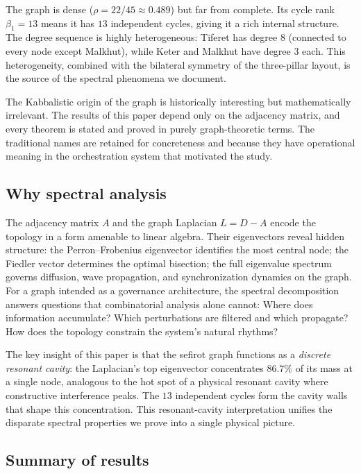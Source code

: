 \documentclass[11pt,a4paper]{amsart}
\theoremstyle{remark}
\begin{document}
The graph is dense ($\rho = 22/45 \approx 0.489$) but far from complete. Its
cycle rank $\beta_1 = 13$ means it has $13$ independent cycles, giving it a
rich internal structure. The degree sequence is highly heterogeneous:
Tiferet has degree $8$ (connected to every node except Malkhut), while Keter
and Malkhut have degree $3$ each. This heterogeneity, combined with the
bilateral symmetry of the three-pillar layout, is the source of the
spectral phenomena we document.

The Kabbalistic origin of the graph is historically interesting but
mathematically irrelevant. The results of this paper depend only on the
adjacency matrix, and every theorem is stated and proved in purely
graph-theoretic terms. The traditional names are retained for concreteness
and because they have operational meaning in the orchestration system that
motivated the study.

\subsection{Why spectral analysis}
\label{sec:why-spectral}

The adjacency matrix $A$ and the graph Laplacian $L = D - A$ encode the
topology in a form amenable to linear algebra. Their eigenvectors reveal
hidden structure: the Perron--Frobenius eigenvector identifies the most
central node; the Fiedler vector determines the optimal bisection; the full
eigenvalue spectrum governs diffusion, wave propagation, and synchronization
dynamics on the graph. For a graph intended as a governance architecture,
the spectral decomposition answers questions that combinatorial analysis
alone cannot: Where does information accumulate? Which perturbations are
filtered and which propagate? How does the topology constrain the system's
natural rhythms?

The key insight of this paper is that the sefirot graph functions as a
\emph{discrete resonant cavity}: the Laplacian's top eigenvector concentrates
$86.7\%$ of its mass at a single node, analogous to the hot spot of a
physical resonant cavity where constructive interference peaks. The $13$
independent cycles form the cavity walls that shape this concentration.
This resonant-cavity interpretation unifies the disparate spectral properties
we prove into a single physical picture.

\subsection{Summary of results}
\label{sec:summary-results}
\end{document}
